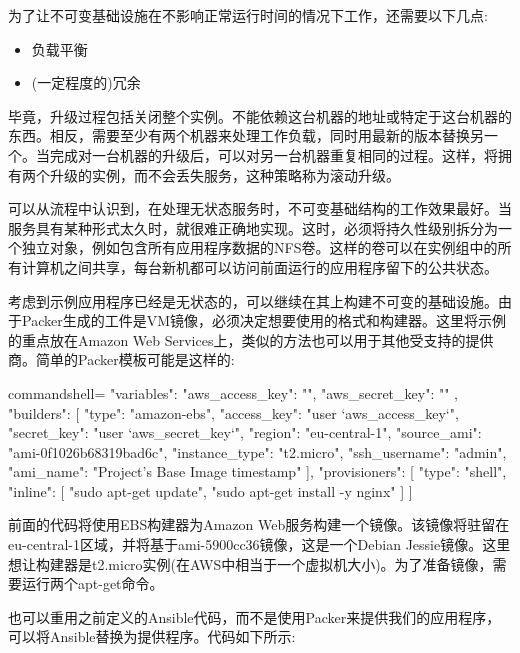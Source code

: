 为了让不可变基础设施在不影响正常运行时间的情况下工作，还需要以下几点:

\begin{itemize}
\item 
负载平衡

\item 
(一定程度的)冗余
\end{itemize}

毕竟，升级过程包括关闭整个实例。不能依赖这台机器的地址或特定于这台机器的东西。相反，需要至少有两个机器来处理工作负载，同时用最新的版本替换另一个。当完成对一台机器的升级后，可以对另一台机器重复相同的过程。这样，将拥有两个升级的实例，而不会丢失服务，这种策略称为滚动升级。

可以从流程中认识到，在处理无状态服务时，不可变基础结构的工作效果最好。当服务具有某种形式太久时，就很难正确地实现。这时，必须将持久性级别拆分为一个独立对象，例如包含所有应用程序数据的NFS卷。这样的卷可以在实例组中的所有计算机之间共享，每台新机都可以访问前面运行的应用程序留下的公共状态。


考虑到示例应用程序已经是无状态的，可以继续在其上构建不可变的基础设施。由于Packer生成的工件是VM镜像，必须决定想要使用的格式和构建器。这里将示例的重点放在Amazon Web Services上，类似的方法也可以用于其他受支持的提供商。简单的Packer模板可能是这样的:

\begin{tcblisting}{commandshell={}}
{
  "variables": {
    "aws_access_key": "",
    "aws_secret_key": ""
  },
  "builders": [{
    "type": "amazon-ebs",
    "access_key": "{{user `aws_access_key`}}",
    "secret_key": "{{user `aws_secret_key`}}",
    "region": "eu-central-1",
    "source_ami": "ami-0f1026b68319bad6c",
    "instance_type": "t2.micro",
    "ssh_username": "admin",
    "ami_name": "Project's Base Image {{timestamp}}"
  }],
  "provisioners": [{
    "type": "shell",
    "inline": [
      "sudo apt-get update",
      "sudo apt-get install -y nginx"
    ]
  }]
}
\end{tcblisting}

前面的代码将使用EBS构建器为Amazon Web服务构建一个镜像。该镜像将驻留在eu-central-1区域，并将基于ami-5900cc36镜像，这是一个Debian Jessie镜像。这里想让构建器是t2.micro实例(在AWS中相当于一个虚拟机大小)。为了准备镜像，需要运行两个apt-get命令。

也可以重用之前定义的Ansible代码，而不是使用Packer来提供我们的应用程序，可以将Ansible替换为提供程序。代码如下所示:

